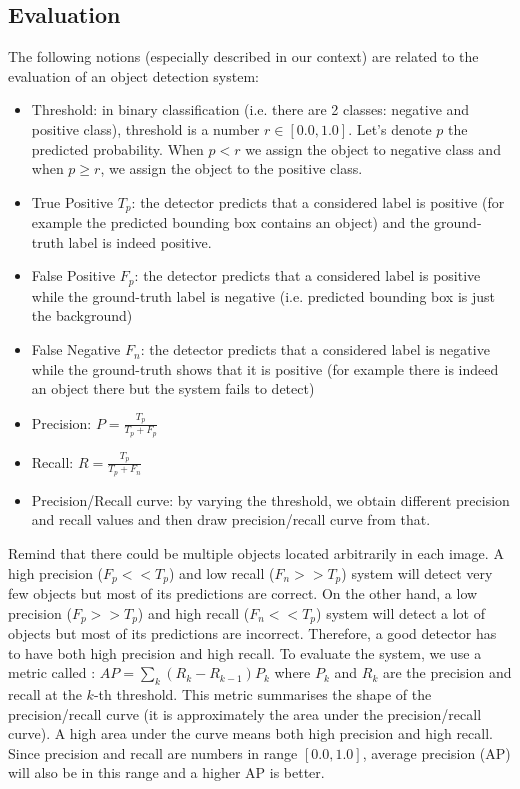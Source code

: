 \subsection{Evaluation}
The following notions (especially described in our context) are related to the evaluation of an object detection system:
\begin{itemize}
	\item Threshold: in binary classification (i.e. there are 2 classes: negative and positive class), threshold is a number $r \in [0.0, 1.0]$. Let's denote $p$ the predicted probability. When $p < r$ we assign the object to negative class and when $p \geq r$, we assign the object to the positive class.
	\item True Positive $T_p$: the detector predicts that a considered label is positive (for example the predicted bounding box contains an object) and the ground-truth label is indeed positive.
	\item False Positive $F_p$: the detector predicts that a considered label is positive while the ground-truth label is negative (i.e. predicted bounding box is just the background)
	\item False Negative $F_n$: the detector predicts that a considered label is negative while the ground-truth shows that it is positive (for example there is indeed an object there but the system fails to detect)
	\item Precision: $P = \frac{T_p}{T_p + F_p}$
	\item Recall: $R = \frac{T_p}{T_p + F_n}$ 
	\item Precision/Recall curve: by varying the threshold, we obtain different precision and recall values and then draw precision/recall curve from that.
\end{itemize}
Remind that there could be multiple objects located arbitrarily in each image. A high precision ($F_p << T_p$) and low recall ($F_n >> T_p$) system will detect very few objects but most of its predictions are correct. On the other hand, a low precision ($F_p >> T_p$) and high recall ($F_n << T_p$) system will detect a lot of objects but most of its predictions are incorrect. Therefore, a good detector has to have both high precision and high recall. To evaluate the system, we use a metric called  \cite{sklearnAPWeb}: $AP = \sum_k (R_k - R_{k-1})P_k$ where $P_k$ and $R_k$ are the precision and recall at the $k$-th threshold. This metric summarises the shape of the precision/recall curve (it is approximately the area under the precision/recall curve). A high area under the curve means both high precision and high recall. Since precision and recall are numbers in range $[0.0, 1.0]$, average precision (AP) will also be in this range and a higher AP is better.

